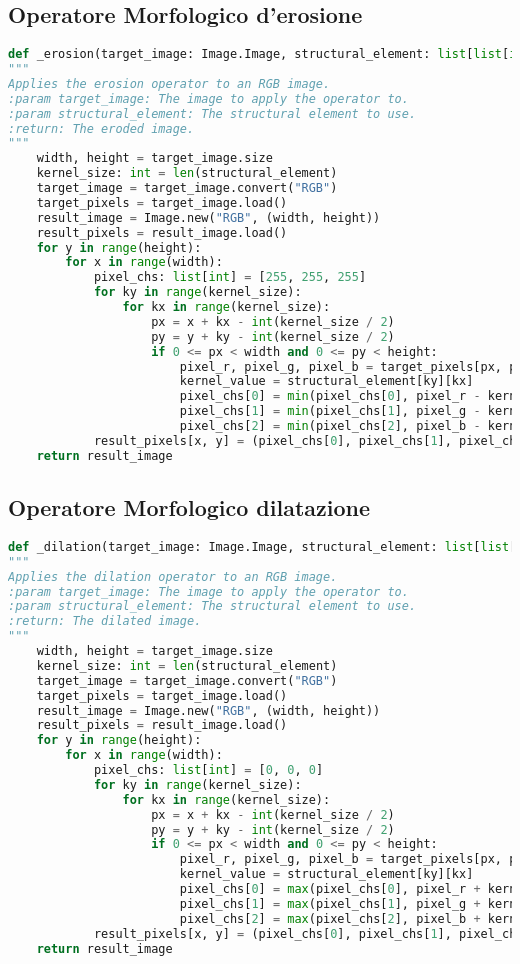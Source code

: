 {\subsection{Operatore Morfologico d'erosione}
{\begin{lstlisting}[language=Python, caption={Codice dell'operatore morfologico erosione}, label={appendix:erosion}]
def _erosion(target_image: Image.Image, structural_element: list[list[int]]) -> Image.Image:
"""
Applies the erosion operator to an RGB image.
:param target_image: The image to apply the operator to.
:param structural_element: The structural element to use.
:return: The eroded image.
"""
	width, height = target_image.size
	kernel_size: int = len(structural_element)
	target_image = target_image.convert("RGB")
	target_pixels = target_image.load()
	result_image = Image.new("RGB", (width, height))
	result_pixels = result_image.load()
	for y in range(height):
		for x in range(width):
			pixel_chs: list[int] = [255, 255, 255]
			for ky in range(kernel_size):
				for kx in range(kernel_size):
					px = x + kx - int(kernel_size / 2)
					py = y + ky - int(kernel_size / 2)
					if 0 <= px < width and 0 <= py < height:
						pixel_r, pixel_g, pixel_b = target_pixels[px, py]
						kernel_value = structural_element[ky][kx]
						pixel_chs[0] = min(pixel_chs[0], pixel_r - kernel_value)
						pixel_chs[1] = min(pixel_chs[1], pixel_g - kernel_value)
						pixel_chs[2] = min(pixel_chs[2], pixel_b - kernel_value)
			result_pixels[x, y] = (pixel_chs[0], pixel_chs[1], pixel_chs[2])
	return result_image
\end{lstlisting}}
\newpage
\subsection{Operatore Morfologico dilatazione}
{\begin{lstlisting}[language=Python, caption={Codice dell'operatore morfologico dilatazione}, label={appendix:dilation}]
def _dilation(target_image: Image.Image, structural_element: list[list[int]]) -> Image.Image:
"""
Applies the dilation operator to an RGB image.
:param target_image: The image to apply the operator to.
:param structural_element: The structural element to use.
:return: The dilated image.
"""
	width, height = target_image.size
	kernel_size: int = len(structural_element)
	target_image = target_image.convert("RGB")
	target_pixels = target_image.load()
	result_image = Image.new("RGB", (width, height))
	result_pixels = result_image.load()
	for y in range(height):
		for x in range(width):
			pixel_chs: list[int] = [0, 0, 0]
			for ky in range(kernel_size):
				for kx in range(kernel_size):
					px = x + kx - int(kernel_size / 2)
					py = y + ky - int(kernel_size / 2)
					if 0 <= px < width and 0 <= py < height:
						pixel_r, pixel_g, pixel_b = target_pixels[px, py]
						kernel_value = structural_element[ky][kx]
						pixel_chs[0] = max(pixel_chs[0], pixel_r + kernel_value)
						pixel_chs[1] = max(pixel_chs[1], pixel_g + kernel_value)
						pixel_chs[2] = max(pixel_chs[2], pixel_b + kernel_value)
			result_pixels[x, y] = (pixel_chs[0], pixel_chs[1], pixel_chs[2])
	return result_image
\end{lstlisting}}
\newpage
}
